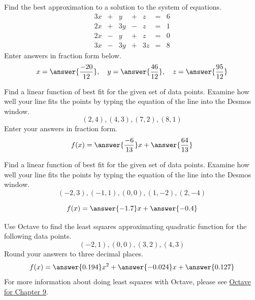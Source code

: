 \documentclass{ximera}
\begin{document}
\begin{problem}\label{prob:leastSq1}
Find the best approximation to a solution to the system of equations.
$$\begin{matrix}3x&+&y&+&z&=&6\\2x&+&3y&-&z&=&1\\2x&-&y&+&z&=&0\\3x&-&3y&+&3z&=&8\end{matrix}$$
Enter answers in fraction form below.
$$x=\answer{\frac{-20}{12}},\quad y=\answer{\frac{46}{12}},\quad z=\answer{\frac{95}{12}}$$
\end{problem}


\begin{problem}\label{prob:leastSq2a}
Find a linear function of best fit for the given set of data points.  Examine how well your line fits the points by typing the equation of the line into the Desmos window.
$$(2,4), (4,3), (7,2), (8,1)$$
Enter your answers in fraction form.
$$f(x)=\answer{\frac{-6}{13}}x+\answer{\frac{64}{13}}$$
\begin{onlineOnly}
\begin{center}
\end{center}
\end{onlineOnly}
\end{problem}

\begin{problem}\label{prob:leastSq2b}
Find a linear function of best fit for the given set of data points.  Examine how well your line fits the points by typing the equation of the line into the Desmos window.
$$(-2, 3), (-1,1), (0,0), (1, -2), (2, -4)$$

$$f(x)=\answer{-1.7}x+\answer{-0.4}$$
\begin{onlineOnly}
\begin{center}
\end{center}
\end{onlineOnly}
\end{problem}

\begin{problem}\label{prob:leastSq3}
Use Octave to find the least squares approximating quadratic function for the following data points.
$$(-2,1),(0,0),(3,2),(4,3)$$
Round your answers to three decimal places.
$$f(x)=\answer{0.194}x^2+\answer{-0.024}x+\answer{0.127}$$
For more information about doing least squares with Octave, please see \href{https://ximera.osu.edu/corela/xOctave/OCT_orth/main}{Octave for Chapter 9}.
\end{problem}
\end{document}
